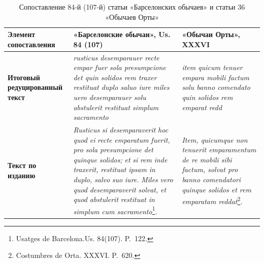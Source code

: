 \begin{center}
\small
\setlength{\tabcolsep}{2pt}
\begin{longtable}{|p{}|p{}|p{}|}
\caption{Сопоставление 84-й (107-й) статьи «Барселонских обычаев» и статьи 36 «Обычаев Орты»}\label{tab:ch1-horta}\\
\hline
\textbf{Элемент сопоставления} & \textbf{«Барселонские обычаи», }\textbf{ }\textbf{Us}\textbf{. }\textbf{84 (}\textbf{107}\textbf{)} & \textbf{«Обычаи Орты»,}\textbf{ }\textbf{XXXVI} \\ \hline
\textbf{Итоговый редуцированный текст} & \emph{rusticus desemparauer recte empar fuer sola presumpcione det quin solidos rem traxer restituat duplo saluo iure miles uero desemparauer solu abstulerit restituat simplum sacramento} & \emph{item quicum tenuer empara mobili factum solu banno comendato quin solidos rem emparat redd} \\ \hline
\textbf{Текст по изданию} & \emph{Rusticus}\emph{ }\emph{si}\emph{ }\emph{desemparaverit}\emph{ }\emph{hoc}\emph{ }\emph{quod}\emph{ }\emph{ei}\emph{ }\emph{recte}\emph{ }\emph{emparatum}\emph{ }\emph{fuerit}\emph{, }\emph{pro}\emph{ }\emph{sola}\emph{ }\emph{presumpcione}\emph{ }\emph{det}\emph{ }\emph{quinque}\emph{ }\emph{solidos}\emph{; }\emph{et}\emph{ }\emph{si}\emph{ }\emph{rem}\emph{ }\emph{inde}\emph{ }\emph{traxerit}\emph{, }\emph{restituat}\emph{ }\emph{ipsam}\emph{ in }\emph{duplo}\emph{, }\emph{salvo}\emph{ }\emph{suo}\emph{ }\emph{iure}\emph{. }\emph{Miles}\emph{ }\emph{vero}\emph{ }\emph{quod}\emph{ }\emph{desemparaverit}\emph{ }\emph{solvat}\emph{, }\emph{et}\emph{ }\emph{quod}\emph{ }\emph{abstulerit}\emph{ }\emph{restituat}\emph{ in }\emph{simplum}\emph{ }\emph{cum}\emph{ }\emph{sacramento}\footnote{Usatges de Barcelona.Us. 84(107). P.~122.}\emph{.} & \emph{Item, quicumque non tenuerit emparamentum de re mobili sibi factum, solvat pro banno comendatori quinque solidos et rem emparatam reddat}\footnote{Costumbres de Orta. XXXVI. P.~620.}\emph{.} \\ \hline

\end{longtable}
\end{center}
